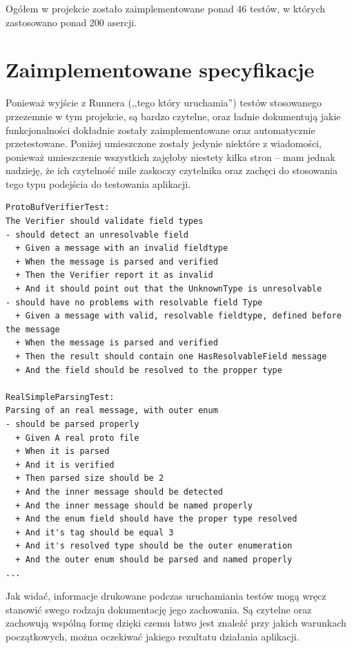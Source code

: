 \documentclass[pdflatex,11pt]{aghdpl}
\begin{document}
Ogółem w projekcie zostało zaimplementowane ponad 46 testów, w których zastosowano ponad 200 asercji.

\section{Zaimplementowane specyfikacje}
Ponieważ wyjście z Runnera (,,tego który uruchamia'') testów stosowanego przezemnie w tym projekcie, są bardzo czytelne, oraz ładnie dokumentują 
jakie funkcjonalności dokładnie zostały zaimplementowane oraz automatycznie przetestowane. Poniżej umieszczone zostały jedynie niektóre z wiadomości,
ponieważ umieszczenie wszystkich zajęłoby niestety kilka stron -- mam jednak nadzieję, że ich czytelność mile zaskoczy czytelnika oraz zachęci do stosowania
tego typu podejścia do testowania aplikacji.

\begin{verbatim}
ProtoBufVerifierTest:
The Verifier should validate field types 
- should detect an unresolvable field
  + Given a message with an invalid fieldtype 
  + When the message is parsed and verified 
  + Then the Verifier report it as invalid 
  + And it should point out that the UnknownType is unresolvable 
- should have no problems with resolvable field Type
  + Given a message with valid, resolvable fieldtype, defined before the message 
  + When the message is parsed and verified 
  + Then the result should contain one HasResolvableField message 
  + And the field should be resolved to the propper type 

RealSimpleParsingTest:
Parsing of an real message, with outer enum 
- should be parsed properly
  + Given A real proto file 
  + When it is parsed 
  + And it is verified 
  + Then parsed size should be 2 
  + And the inner message should be detected 
  + And the inner message should be named properly 
  + And the enum field should have the proper type resolved 
  + And it's tag should be equal 3 
  + And it's resolved type should be the outer enumeration 
  + And the outer enum should be parsed and named properly 
...
\end{verbatim}

Jak widać, informacje drukowane podczas uruchamiania testów mogą wręcz stanowić swego rodzaju dokumentację jego zachowania.
Są czytelne oraz zachowują wspólną formę dzięki czemu łatwo jest znaleźć przy jakich warunkach początkowych, można oczekiwać 
jakiego rezultatu działania aplikacji.

\end{document}
